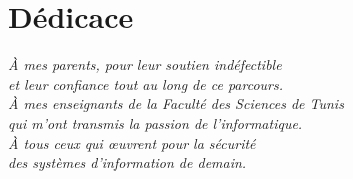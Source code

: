 \chapter*{Dédicace}
\thispagestyle{empty}
\vspace*{4cm}
\begin{center}
\textit{À mes parents, pour leur soutien indéfectible\\
et leur confiance tout au long de ce parcours.}\\[1cm]
\textit{À mes enseignants de la Faculté des Sciences de Tunis\\
qui m'ont transmis la passion de l'informatique.}\\[1cm]
\textit{À tous ceux qui œuvrent pour la sécurité\\
des systèmes d'information de demain.}
\end{center}
\cleardoublepage
